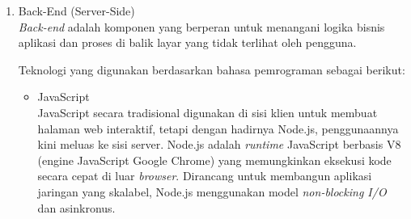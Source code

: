 \begin{enumerate}[label*=\arabic*.,ref=\arabic*]
\begin{enumerate}[label=\alph*.]
            \item Back-End (Server-Side)\\
                \textit{Back-end} adalah komponen yang berperan untuk menangani logika bisnis aplikasi dan proses di balik layar yang tidak terlihat oleh pengguna.

                Teknologi yang digunakan berdasarkan bahasa pemrograman sebagai berikut:
                \begin{itemize}
                    \item JavaScript\\
                        JavaScript secara tradisional digunakan di sisi klien untuk membuat halaman web interaktif, tetapi dengan hadirnya Node.js, penggunaannya kini meluas ke sisi server. Node.js adalah \textit{runtime} JavaScript berbasis V8 (engine JavaScript Google Chrome) yang memungkinkan eksekusi kode secara cepat di luar \textit{browser}. Dirancang untuk membangun aplikasi jaringan yang skalabel, Node.js menggunakan model \textit{non-blocking I/O} dan asinkronus.


\end{itemize}
\end{enumerate}
\end{enumerate}
